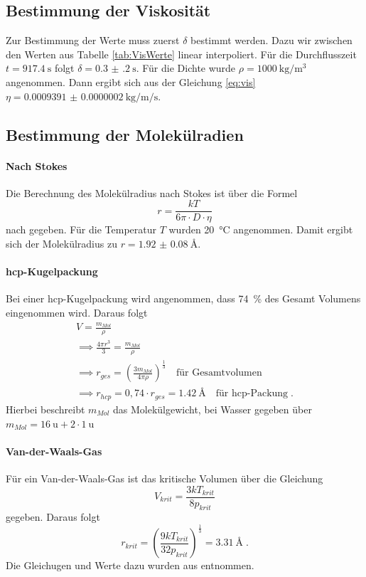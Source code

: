 \subsection{Bestimmung der Viskosität}
Zur Bestimmung der Werte muss zuerst $\delta$ bestimmt werden. Dazu wir zwischen den Werten aus Tabelle \ref{tab:VisWerte} 
linear interpoliert. Für die Durchflusszeit $t = \SI{917 .4}{\second}$ folgt $\delta = \SI{0.3(2)}{\second}$. Für die 
Dichte wurde $\rho = \SI{1000}{\kilo\gram\per \cubic\meter}$ angenommen. Dann ergibt sich 
aus der Gleichung \eqref{eq:vis} $\eta = \SI{0.0009391(2)}{\kilo\gram\per\meter\per\second}$.
\subsection{Bestimmung der Molekülradien}
\paragraph{Nach Stokes}
Die Berechnung des Molekülradius nach Stokes ist über die Formel 
\begin{equation}
r = \frac{kT}{6\pi \cdot D \cdot \eta} 	
\end{equation}
nach \cite{Anleitung} gegeben. Für die Temperatur $T$ wurden \SI{20}{\celsius} angenommen. Damit ergibt sich der 
Molekülradius zu $r = \SI{1.92(8)}{\angstrom}$. 
\paragraph{hcp-Kugelpackung}
Bei einer hcp-Kugelpackung wird angenommen, dass \SI{74}{\percent} des Gesamt Volumens eingenommen wird. Daraus folgt 
\begin{gather}
V = \frac{m_{Mol}}{\rho} \\
\implies \frac{4\pi r^3}{3} =\frac{m_{Mol}}{\rho} \\
\implies r_{ges} = \left( \frac{3m_{Mol}}{4\pi \rho } \right)^{\frac{1}{3}} \quad \text{für Gesamtvolumen} \\
\implies r_{hcp} = 0,74 \cdot r_{ges} = \SI{1,42}{\angstrom} \quad \text{für hcp-Packung} \; . 
\end{gather}
Hierbei beschreibt $m_{Mol}$ das Molekülgewicht, bei Wasser gegeben über $m_{Mol} = \SI{16}{\atomicmassunit} + 2\cdot \SI{1}{\atomicmassunit}$
\paragraph{Van-der-Waals-Gas}
Für ein Van-der-Waals-Gas ist das kritische Volumen über die Gleichung 
\begin{equation}
V_{krit}= \frac{3kT_{krit}}{8p_{krit}}	
\end{equation}
gegeben. Daraus folgt 
\begin{equation}
r_{krit} = \left( \frac{9kT_{krit}}{32p_{krit}} \right)^{\frac{1}{3}} = \SI{3,31}{\angstrom} \;.
\end{equation}
Die Gleichugen und Werte dazu wurden aus \cite{spektrum} entnommen.

